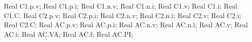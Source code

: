 \begin{boxedverbatim}
Real C1.p.v;
Real C1.p.i;
Real C1.n.v;
Real C1.n.i;
Real C1.v;
Real C1.i;
Real C1.C;
Real C2.p.v;
Real C2.p.i;
Real C2.n.v;
Real C2.n.i;
Real C2.v;
Real C2.i;
Real C2.C;
Real AC.p.v;
Real AC.p.i;
Real AC.n.v;
Real AC.n.i;
Real AC.v;
Real AC.i;
Real AC.VA;
Real AC.f;
Real AC.PI;
\end{boxedverbatim}
